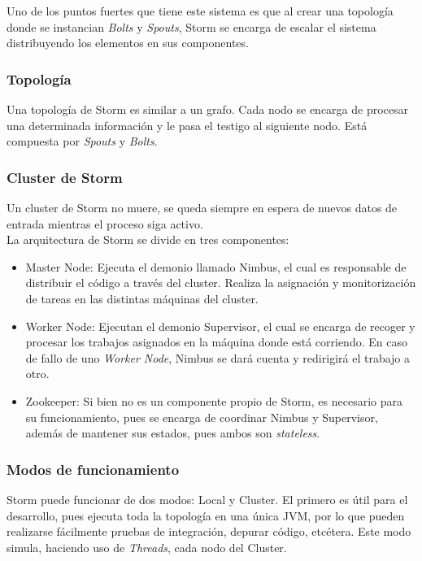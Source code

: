 	Uno de los puntos fuertes que tiene este sistema es que al crear una topología donde se instancian \textit{Bolts} y \textit{Spouts}, Storm se encarga de escalar el sistema distribuyendo los elementos en sus componentes.\\

	\subsubsection{Topología}

	Una topología de Storm es similar a un grafo. Cada nodo se encarga de procesar una determinada información y le pasa el testigo al siguiente nodo. Está compuesta por \textit{Spouts} y \textit{Bolts}.\\

	\subsubsection{Cluster de Storm}

	Un cluster de Storm no muere, se queda siempre en espera de nuevos datos de entrada mientras el proceso siga activo.\\

	La arquitectura de Storm se divide en tres componentes:
	\begin{itemize}
	\item Master Node: Ejecuta el demonio llamado Nimbus, el cual es responsable de distribuir el código a través del cluster. Realiza la asignación y monitorización de tareas en las distintas máquinas del cluster.
	\item Worker Node: Ejecutan el demonio Supervisor, el cual se encarga de recoger y procesar los trabajos asignados en la máquina donde está corriendo. En caso de fallo de uno \textit{Worker Node}, Nimbus se dará cuenta y redirigirá el trabajo a otro.
	\item Zookeeper: Si bien no es un componente propio de Storm, es necesario para su funcionamiento, pues se encarga de coordinar Nimbus y Supervisor, además de mantener sus estados, pues ambos son \textit{stateless}.
	\end{itemize}

	\subsubsection{Modos de funcionamiento}

	Storm puede funcionar de dos modos: Local y Cluster. El primero es útil para el desarrollo, pues ejecuta toda la topología en una única JVM, por lo que pueden realizarse fácilmente pruebas de integración, depurar código, etcétera. Este modo simula, haciendo uso de \textit{Threads}, cada nodo del Cluster.\\


